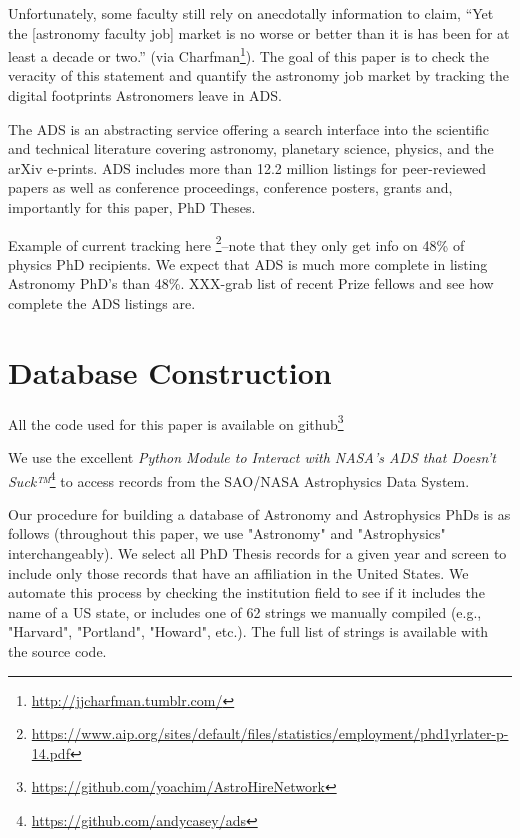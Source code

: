 \documentclass[preprint2]{aastex}
\begin{document}
Unfortunately, some faculty still rely on anecdotally information to claim, ``Yet the [astronomy faculty job] market is no worse or better than it is has been for at least a decade or two.'' (via Charfman\footnote{\url{http://jjcharfman.tumblr.com/}}).  The goal of this paper is to check the veracity of this statement and quantify the astronomy job market by tracking the digital footprints Astronomers leave in ADS. 

The ADS is an abstracting service offering a search interface into the scientific and technical literature covering astronomy, planetary science, physics, and the arXiv e-prints.  ADS includes more than 12.2 million listings for peer-reviewed papers as well as conference proceedings, conference posters, grants and, importantly for this paper, PhD Theses.  

Example of current tracking here \footnote{\url{https://www.aip.org/sites/default/files/statistics/employment/phd1yrlater-p-14.pdf}}--note that they only get info on 48\% of physics PhD recipients.  We expect that ADS is much more complete in listing Astronomy PhD's than 48\%. XXX-grab list of recent Prize fellows and see how complete the ADS listings are.



\section{Database Construction}\label{sec:db_construct}

All the code used for this paper is available on github\footnote{\url{https://github.com/yoachim/AstroHireNetwork}}

We use the excellent {\emph{Python Module to Interact with NASA's ADS that Doesn't Suck™}}\footnote{\url{https://github.com/andycasey/ads}} to access records from the SAO/NASA Astrophysics Data System. 

Our procedure for building a database of Astronomy and Astrophysics PhDs is as follows (throughout this paper, we use "Astronomy" and "Astrophysics" interchangeably).  We select all PhD Thesis records for a given year and screen to include only those records that have an affiliation in the United States. We automate this process by checking the institution field to see if it includes the name of a US state, or includes one of 62 strings we manually compiled (e.g., "Harvard", "Portland", "Howard", etc.). The full list of strings is available with the source code.
\end{document}
